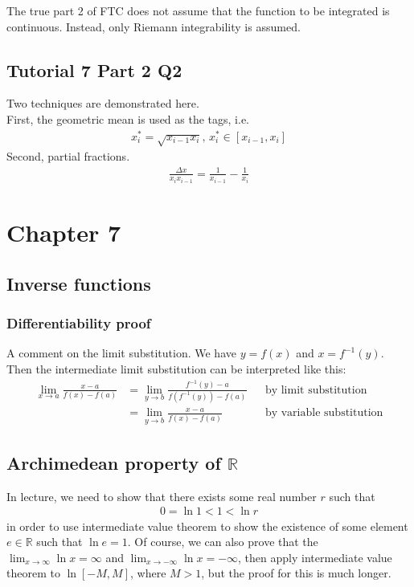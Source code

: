 \documentclass{article}
\begin{document}
The true part 2 of FTC does not assume that the function to be integrated is continuous. Instead, only Riemann integrability is assumed.


\subsection{Tutorial 7 Part 2 Q2}
Two techniques are demonstrated here.\\
First, the geometric mean is used as the tags, i.e.
\begin{align*}
    x_i^*=\sqrt{x_{i-1}x_i},\, x_i^*\in [x_{i-1}, x_i]
\end{align*}
Second, partial fractions.
\begin{align*}
    \frac{\Delta x}{x_ix_{i-1}}=\frac{1}{x_{i-1}}-\frac{1}{x_i}
\end{align*}

\section{Chapter 7}
\subsection{Inverse functions}
\subsubsection{Differentiability proof}
A comment on the limit substitution.
We have $y=f(x)$ and $x=f^{-1}(y)$.
Then the intermediate limit substitution can be interpreted like this:
\begin{align*}
    \lim_{x\rightarrow a}\frac{x-a}{f(x)-f(a)} &= \lim_{y\rightarrow b}\frac{f^{-1}(y) - a}{f(f^{-1}(y))-f(a)} &&\text{by limit substitution} \\
    &= \lim_{y\rightarrow b}\frac{x-a}{f(x)-f(a)} &&\text{by variable substitution}
\end{align*}

\subsection{Archimedean property of $\mathbb{R}$}
In lecture, we need to show that there exists some real number $r$ such that 
\begin{align*}
    0 = \ln 1 < 1 < \ln r
\end{align*}
in order to use intermediate value theorem to show the existence of some element $e\in \mathbb{R}$ such that $\ln e=1$. Of course, we can also prove that the $\lim_{x\rightarrow \infty}\ln x=\infty$ and $\lim_{x\rightarrow -\infty}\ln x=-\infty$, then apply intermediate value theorem to $\ln[-M, M]$, where $M>1$, but the proof for this is much longer.
\end{document}
